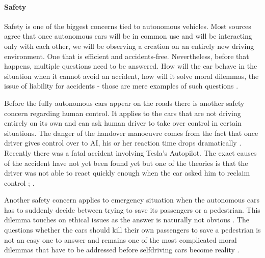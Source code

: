 \documentclass[11pt,english]{article}
\begin{document}




\paragraph{Safety}

Safety is one of the biggest concerns tied to autonomous vehicles. Most sources agree that once autonomous cars will be in common use and will be interacting only with each other, we will be observing a creation on an entirely new driving environment. One that is efficient and accidents-free. Nevertheless, before that happens, multiple questions need to be answered. How will the car behave in the situation when it cannot avoid an accident, how will it solve moral dilemmas, the issue of liability for accidents  - those are mere examples of such questions \citep{techtimes}. 
 


\par
Before the fully autonomous cars appear on the roads there is another safety concern regarding human control. It applies to the cars that are not driving entirely on its own and can ask human driver to take over control in certain situations. The danger of the handover manoeuvre comes from the fact that once driver gives control over to AI, his or her reaction time drops dramatically \citep{merat2009drivers}. Recently there was a fatal accident involving Tesla's Autopilot. The exact causes of the accident have not yet been found yet but one of the theories is that the driver was not able to react quickly enough when the car asked him to reclaim control \citep{teslacrash}; \citep{tesla4}. 

\par
Another safety concern applies to emergency situation when the autonomous cars has to suddenly decide between trying to save its passengers or a pedestrian. This dilemma touches on ethical issues as the answer is naturally not obvious \citep{qz}. The questions whether the cars should kill their own passengers to save a pedestrian is not an easy one to answer and remains one of the most complicated moral dilemmas that have to be addressed before selfdriving cars become reality \citep{bonnefon2015autonomous}.
\end{document}
